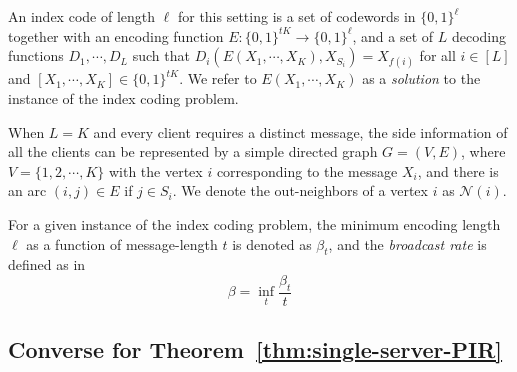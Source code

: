 \documentclass[letterpaper, 10 pt, conference]{ieeeconf}
\newcommand\salimn[1]{\notee[salim]{#1}}
\newcommand\swanand[1]{\notee[swanand]{#1}}
\newcommand{\Xj}[1]{X_{#1}} %
\newcommand{\A}[2]{A^{[#1,#2]}} %
\begin{document}
An index code of length $\ell$ for this setting is a set of codewords in $\{0,1\}^{\ell}$ together with an encoding function $E:\{0,1\}^{tK} \rightarrow \{0,1\}^{\ell}$, and a set of $L$ decoding functions $D_1, \cdots, D_L$ such that $D_i\left(E\left(X_1,\cdots,X_K\right),X_{S_i}\right) = \Xj{f(i)}$ for all $i\in[L]$ and $[X_1, \cdots, X_K] \in \{0,1\}^{tK}$. We refer to $E\left(X_1,\cdots,X_K\right)$ as a {\it solution} to the instance of the index coding problem. 


When $L = K$ and every client requires a distinct message, the side information of all the clients can be represented 
by a simple directed graph $G = \left(V,E\right)$, where $V = \{1,2,\cdots,K\}$ with the  vertex $i$ corresponding to the message $\Xj{i}$, and there is an arc $(i,j)\in E$ if $j \in S_i$. %
 We denote the out-neighbors of a vertex $i$ as $\mathcal{N}(i)$.

For a given instance of the index coding problem, the minimum encoding length $\ell$ as a function of message-length $t$ is denoted as $\beta_t$, and the {\it broadcast rate} is defined as in ~\cite{Alon:FOCS:08, Blasiak:IT:13}
\begin{equation}
\label{eq:broadcast-rate}
\beta = \inf_t \frac{\beta_t}{t} 
\end{equation}


\subsection{Converse for Theorem~\ref{thm:single-server-PIR}}
%
\label{sec:converse-partitioning}
\end{document}
